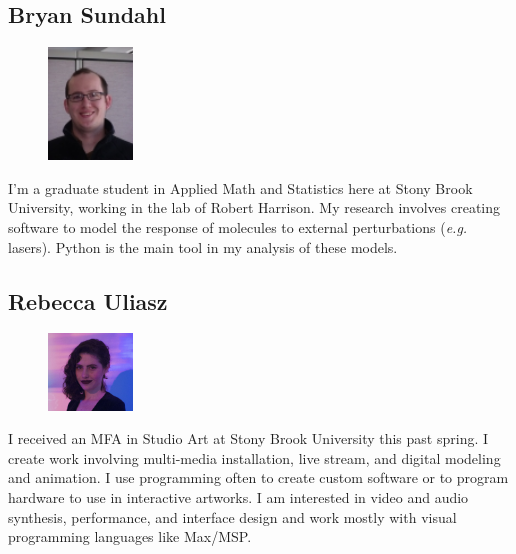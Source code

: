 \documentclass[]{article}
\begin{document}
\subsection*{Bryan Sundahl} 
\begin{figure}
\begin{centering}
    \includegraphics[width=0.2\textwidth]{bryan.jpg}
\end{centering}
\end{figure}
I'm a graduate student in Applied Math and Statistics here at Stony Brook University, working in the lab of Robert Harrison. My research involves creating software to model the response of molecules to external perturbations (\textit{e.g.} lasers).  Python is the main tool in my analysis of these models. 

\vspace{0.5 in}

\subsection*{Rebecca Uliasz} 
\begin{figure}
\begin{centering}
    \includegraphics[width=0.2\textwidth]{rebecca.jpg}
\end{centering}
\end{figure}
I received an MFA in Studio Art at Stony Brook University this past spring. I create work involving multi-media installation, live stream, and digital modeling and animation. I use programming often to create custom software or to program hardware to use in interactive artworks. I am interested in video and audio synthesis, performance, and interface design and work mostly with visual programming languages like Max/MSP. 
\end{document}
